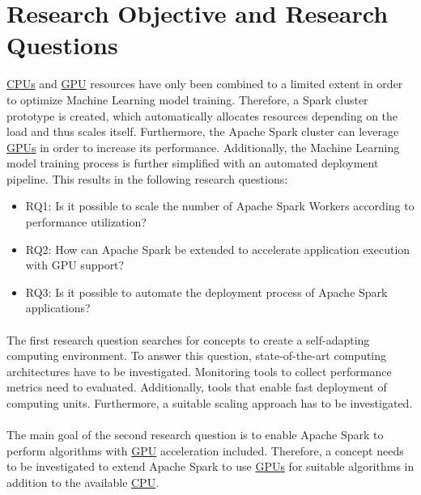 \section{Research Objective and Research Questions}
\hyperlink{abbr:cpu}{CPUs} and \hyperlink{abbr:gpu}{GPU} resources have only been combined to a limited extent in order to optimize Machine Learning model training. Therefore, a Spark cluster prototype is created, which automatically allocates resources depending on the load and thus scales itself. Furthermore, the Apache Spark cluster can leverage \hyperlink{abbr:gpu}{GPUs} in order to increase its performance.
Additionally, the Machine Learning model training process is further simplified with an automated deployment pipeline.
This results in the following research questions:
\begin{itemize}
\item RQ1: Is it possible to scale the number of Apache Spark Workers according to performance utilization?
\item RQ2: How can Apache Spark be extended to accelerate application execution with GPU support?
\item RQ3: Is it possible to automate the deployment process of Apache Spark applications?
\end{itemize}


\paragraph{}
The first research question searches for concepts to create a self-adapting computing environment.
To answer this question, state-of-the-art computing architectures have to be investigated.
Monitoring tools to collect performance metrics need to evaluated. Additionally, tools that enable fast deployment of computing units.
Furthermore, a suitable scaling approach has to be investigated.


\paragraph{}
The main goal of the second research question is to enable Apache Spark to perform algorithms with \hyperlink{abbr:gpu}{GPU} acceleration included.
Therefore, a concept needs to be investigated to extend Apache Spark to use \hyperlink{abbr:gpu}{GPUs} for suitable algorithms in addition to the available \hyperlink{abbr:cpu}{CPU}.


